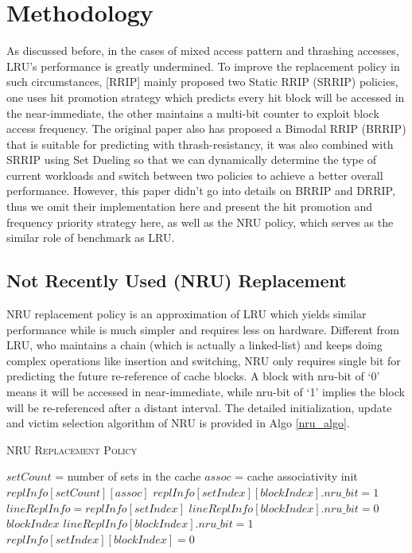 \documentclass[conference]{IEEEtran}
\begin{document}
\section{Methodology}
As discussed before, in the cases of mixed access pattern and thrashing accesses, LRU's performance is greatly undermined. To improve the replacement policy in such circumstances, [RRIP] mainly proposed two Static RRIP (SRRIP) policies, one uses hit promotion strategy which predicts every hit block will be accessed in the near-immediate, the other maintains a multi-bit counter to exploit block access frequency. The original paper also has proposed a Bimodal RRIP (BRRIP) that is suitable for predicting with thrash-resistancy, it was also combined with SRRIP using Set Dueling \cite{qureshi2007adaptive} so that we can dynamically determine the type of current workloads and switch between two policies to achieve a better overall performance. However, this paper didn't go into details on BRRIP and DRRIP, thus we omit their implementation here and present the hit promotion and frequency priority strategy here, as well as the NRU policy, which serves as the similar role of benchmark as LRU.
\subsection{Not Recently Used (NRU) Replacement}
NRU replacement policy is an approximation of LRU which yields similar performance while is much simpler and requires less on hardware. Different from LRU, who maintains a chain (which is actually a linked-list) and keeps doing complex operations like insertion and switching, NRU only requires single bit for predicting the future re-reference of cache blocks. A block with nru-bit of  `0' means it will be accessed in near-immediate, while nru-bit of `1' implies the block will be re-referenced after a distant interval. The detailed initialization, update and victim selection algorithm of NRU is provided in Algo \ref{nru_algo}.
\begin{algorithm}[!htp]
  \caption{\textsc{NRU Replacement Policy}}
  \label{nru_algo}
  \begin{algorithmic}
	\State $setCount$ = number of sets in the cache
	\State $assoc$ = cache associativity
	\State init $replInfo[setCount][assoc]$
			\State $replInfo[setIndex][blockIndex].nru\_bit = 1$
		\EndFor
	\EndFor
  \EndFunction
	\State $lineReplInfo = replInfo[setIndex]$
			\State $lineReplInfo[blockIndex].nru\_bit = 0$
			\State \Return $blockIndex$
		\EndIf
	\EndFor
		\State $lineReplInfo[blockIndex].nru\_bit = 1$
	\EndFor
	\State {}
  \EndFunction
		\State $replInfo[setIndex][blockIndex] = 0$
	\EndIf
	\State {}
  \EndFunction
  \end{algorithmic}
\end{algorithm}
\end{document}
